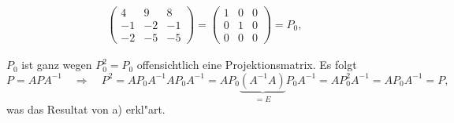 \begin{loesung}
\begin{teilaufgaben}
\begin{align*}
\begin{pmatrix}
 4& 9& 8\\
-1&-2&-1\\
-2&-5&-5
\end{pmatrix}
=
\begin{pmatrix}
1&0&0\\
0&1&0\\
0&0&0
\end{pmatrix}
=P_0,
\end{align*}
\item
$P_0$ ist ganz wegen
$P_0^2=P_0$
offensichtlich eine Projektionsmatrix.
Es folgt
\[
P=APA^{-1}
\quad\Rightarrow\quad
P^2
=
AP_0A^{-1} AP_0A^{-1}
=
AP_0\underbrace{(A^{-1} A)}_{\displaystyle =E}P_0A^{-1}
=
AP_0^2A^{-1}
=
AP_0A^{-1}
=
P,
\]
was das Resultat von a) erkl"art.
\qedhere
\end{teilaufgaben}
\end{loesung}

